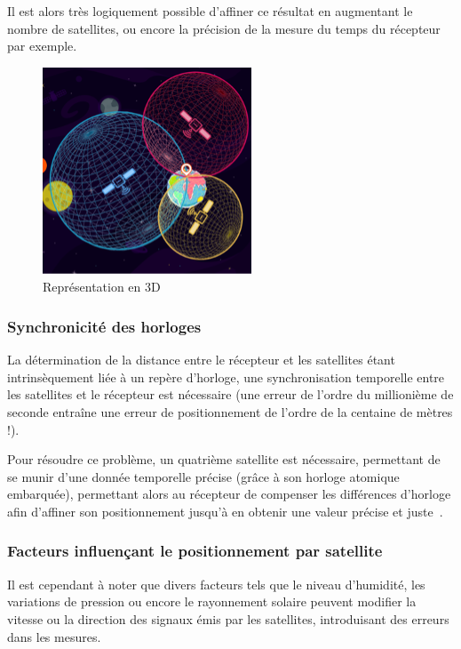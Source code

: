          Il est alors très logiquement possible d'affiner ce résultat en augmentant le nombre de satellites, ou encore la précision de la mesure du temps du récepteur par exemple.

         \begin{figure}[h]
             \centering
             \includegraphics[width=.5\textwidth]{imgs/sat-3D}
             \caption{Représentation en 3D}
             \label{fig:repr3d}
         \end{figure}

      \subsubsection{Synchronicité des horloges}
         La détermination de la distance entre le récepteur et les satellites étant intrinsèquement liée à un repère d'horloge, une synchronisation temporelle entre les satellites et le récepteur est nécessaire (une erreur de l'ordre du millionième de seconde entraîne une erreur de positionnement de l'ordre de la centaine de mètres !).

         Pour résoudre ce problème, un quatrième satellite est nécessaire, permettant de se munir d'une donnée temporelle précise (grâce à son horloge atomique embarquée), permettant alors au récepteur de compenser les différences d'horloge afin d'affiner son positionnement jusqu'à en obtenir une valeur précise et juste~\cite{gebre-egziabherGNSSApplicationsMethods2009}.

      \subsubsection{Facteurs influençant le positionnement par satellite}
         Il est cependant à noter que divers facteurs tels que le niveau d'humidité, les variations de pression ou encore le rayonnement solaire peuvent modifier la vitesse ou la direction des signaux émis par les satellites, introduisant des erreurs dans les mesures.

